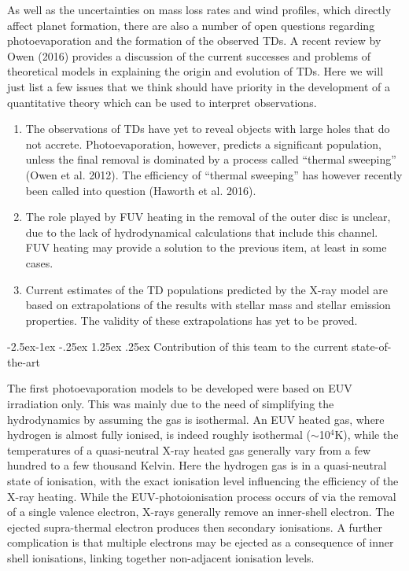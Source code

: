 \documentclass[10pt,fleqn,twoside]{article}
\makeatletter
\renewcommand\paragraph{\@startsection{paragraph}{4}{\z@}%
            {-2.5ex\@plus -1ex \@minus -.25ex}%
            {1.25ex \@plus .25ex}%
            {\normalfont\normalsize\bfseries}}
\makeatother
\begin{document}
As well as the uncertainties on mass loss rates and wind profiles,
which directly affect planet formation, there are also a number of
open questions regarding photoevaporation and the formation of the
observed TDs. A recent review by Owen (2016) provides a discussion of
the current successes and problems of theoretical models in
explaining the origin and evolution of TDs. Here we will just list a
few issues that we think should have priority in the development of a
quantitative theory which can be used to interpret observations. 

\begin{enumerate}
\item The observations of TDs have yet to reveal objects with large
  holes that do not accrete. Photoevaporation, however, predicts a
  significant population, unless the final removal is dominated by a
  process called ``thermal sweeping'' (Owen et al. 2012). The
  efficiency of  ``thermal sweeping'' has however recently been called
  into question (Haworth et al. 2016). 
\item The role played by FUV heating in the removal of the outer disc
  is unclear, due to the lack of hydrodynamical calculations that
  include this channel. FUV heating may provide a solution to the
 previous item, at least in some cases.
\item Current estimates of the TD populations predicted by the X-ray
  model are based on extrapolations of the results with stellar mass
  and stellar emission properties. The validity of these
  extrapolations has yet to be proved. 
\end{enumerate}

\paragraph{Contribution of this team to the current state-of-the-art}

The first photoevaporation models to be developed were based on EUV
irradiation only. This was mainly due to the need of simplifying the
hydrodynamics by assuming the gas is isothermal. 
An EUV heated gas, where
hydrogen is almost fully ionised, is indeed roughly isothermal
($\sim$10$^4$K), while the temperatures of a quasi-neutral X-ray
heated gas generally vary from a few hundred to a few thousand 
Kelvin. Here the hydrogen gas is in a quasi-neutral state of ionisation, with the
exact ionisation level influencing the efficiency of the X-ray
heating. While the EUV-photoionisation process occurs of via the removal
of a single valence electron, X-rays generally remove an inner-shell
electron. The ejected supra-thermal electron produces then secondary
ionisations. A further complication is that multiple electrons may be
ejected as a consequence of inner shell ionisations, linking together
non-adjacent ionisation levels.
\end{document}
